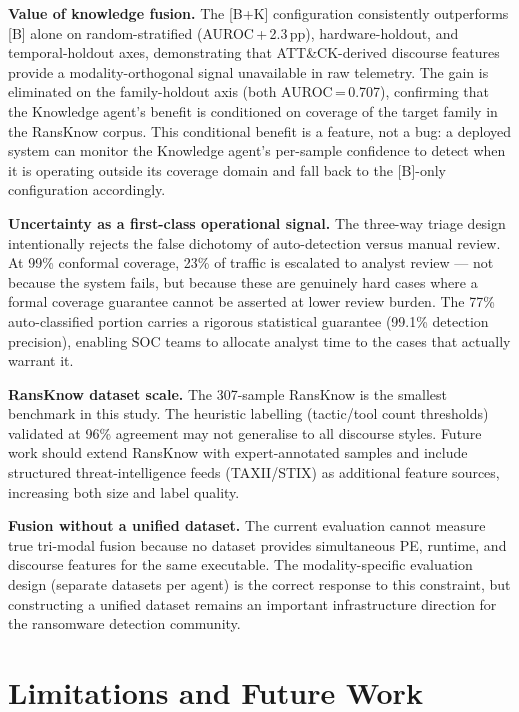 \documentclass[journal]{IEEEtran}
\begin{document}
\textbf{Value of knowledge fusion.}
The [B+K] configuration consistently outperforms [B] alone on
random-stratified (AUROC\,+\,2.3\,pp), hardware-holdout, and temporal-holdout
axes, demonstrating that ATT\&CK-derived discourse features provide a
modality-orthogonal signal unavailable in raw telemetry.
The gain is eliminated on the family-holdout axis (both AUROC\,=\,0.707),
confirming that the Knowledge agent's benefit is conditioned on coverage of
the target family in the RansKnow corpus.
This conditional benefit is a feature, not a bug: a deployed system can
monitor the Knowledge agent's per-sample confidence to detect when it is
operating outside its coverage domain and fall back to the [B]-only
configuration accordingly.

\textbf{Uncertainty as a first-class operational signal.}
The three-way triage design intentionally rejects the false dichotomy of
auto-detection versus manual review.
At 99\% conformal coverage, 23\% of traffic is escalated to analyst review
--- not because the system fails, but because these are genuinely hard cases
where a formal coverage guarantee cannot be asserted at lower review burden.
The 77\% auto-classified portion carries a rigorous statistical guarantee
(99.1\% detection precision), enabling SOC teams to allocate analyst time to
the cases that actually warrant it.

\textbf{RansKnow dataset scale.}
The 307-sample RansKnow is the smallest benchmark in this study.
The heuristic labelling (tactic/tool count thresholds) validated at 96\%
agreement may not generalise to all discourse styles.
Future work should extend RansKnow with expert-annotated samples and include
structured threat-intelligence feeds (TAXII/STIX) as additional feature
sources, increasing both size and label quality.

\textbf{Fusion without a unified dataset.}
The current evaluation cannot measure true tri-modal fusion because no dataset
provides simultaneous PE, runtime, and discourse features for the same
executable.
The modality-specific evaluation design (separate datasets per agent) is the
correct response to this constraint, but constructing a unified dataset remains
an important infrastructure direction for the ransomware detection community.

\section{Limitations and Future Work}
\label{sec:limitations}
\end{document}
